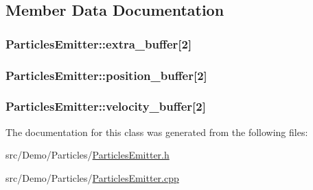 \subsection{Member Data Documentation}
\hypertarget{class_particles_emitter_a114fec3226d013ad87726693b3619629}{
\subsubsection[{extra\+\_\+buffer}]{ Particles\+Emitter\+::extra\+\_\+buffer\mbox{[}2\mbox{]}}}\label{class_particles_emitter_a114fec3226d013ad87726693b3619629}
\hypertarget{class_particles_emitter_aaa728ecd42b97efd1e8900518956fd09}{
\subsubsection[{position\+\_\+buffer}]{ Particles\+Emitter\+::position\+\_\+buffer\mbox{[}2\mbox{]}}}\label{class_particles_emitter_aaa728ecd42b97efd1e8900518956fd09}
\hypertarget{class_particles_emitter_a8f15127a5f7247f56dce194e35154e80}{
\subsubsection[{velocity\+\_\+buffer}]{ Particles\+Emitter\+::velocity\+\_\+buffer\mbox{[}2\mbox{]}}}\label{class_particles_emitter_a8f15127a5f7247f56dce194e35154e80}


The documentation for this class was generated from the following files\+:\begin{DoxyCompactItemize}
\item 
src/\+Demo/\+Particles/\hyperlink{_particles_emitter_8h}{Particles\+Emitter.\+h}\item 
src/\+Demo/\+Particles/\hyperlink{_particles_emitter_8cpp}{Particles\+Emitter.\+cpp}\end{DoxyCompactItemize}
